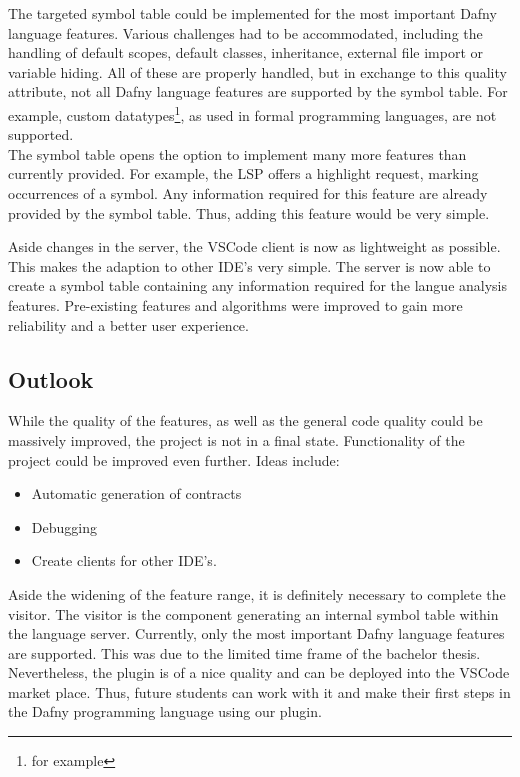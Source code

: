 The targeted symbol table could be implemented for the most important Dafny language features.
Various challenges had to be accommodated, including the handling of default scopes, default classes, inheritance, external file import or variable hiding.
All of these are properly handled, but in exchange to this quality attribute, not all Dafny language features are supported by the symbol table.
For example, custom datatypes\footnote{for example }, as used in formal programming languages, are not supported.\\

The symbol table opens the option to implement many more features than currently provided.
For example, the LSP offers a highlight request, marking occurrences of a symbol.
Any information required for this feature are already provided by the symbol table.
Thus, adding this feature would be very simple.


Aside changes in the server, the VSCode client is now as lightweight as possible.
This makes the adaption to other IDE's very simple.
The server is now able to create a symbol table containing any information required for the langue analysis features.
Pre-existing features and algorithms were improved to gain more reliability and a better user experience.



\subsection{Outlook}
While the quality of the features, as well as the general code quality could be massively improved, the project is not in a final state.
Functionality of the project could be improved even further.
Ideas include:
\begin{itemize}
    \item Automatic generation of contracts
    \item Debugging
    \item Create clients for other IDE's.
\end{itemize}
Aside the widening of the feature range, it is definitely necessary to complete the visitor.
The visitor is the component generating an internal symbol table within the language server.
Currently, only the most important Dafny language features are supported.
This was due to the limited time frame of the bachelor thesis.
Nevertheless, the plugin is of a nice quality and can be deployed into the VSCode market place.
Thus, future students can work with it and make their first steps in the Dafny programming language using our plugin.